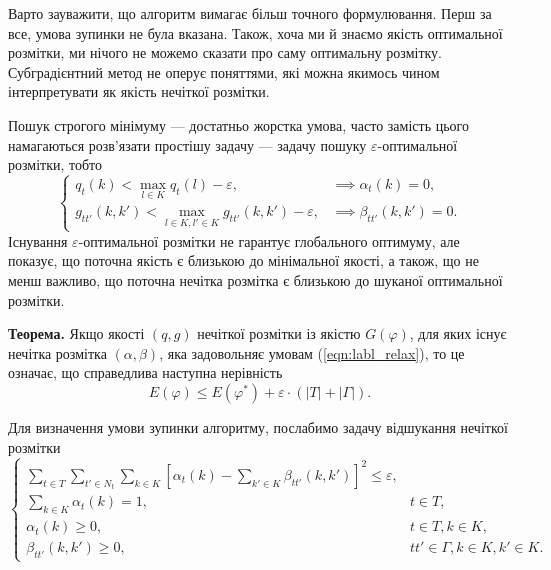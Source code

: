 Варто зауважити, що алгоритм вимагає більш точного формулювання. Перш за все, 
умова зупинки не була вказана. Також, хоча ми й знаємо якість оптимальної розмітки, 
ми нічого не можемо сказати про саму оптимальну розмітку. Субградієнтний метод
не оперує поняттями, які можна якимось чином інтерпретувати як якість нечіткої розмітки.

Пошук строгого мінімуму --- достатньо жорстка умова, часто замість цього намагаються 
розв'язати простішу задачу --- задачу пошуку $\varepsilon$-оптимальної розмітки, тобто
\begin{equation}
    \begin{cases}
    \label{eqn:labl_relax}
      q_t(k) < \max\limits_{l\in K}q_t(l)-\varepsilon , & \implies \alpha_t(k)=0,\\
      g_{tt'}(k,k')< \max\limits_{l\in K, l'\in K}g_{tt'}(k,k')-\varepsilon, & \implies \beta_{tt'}(k,k')=0.
    \end{cases}
  \end{equation}
Існування $\varepsilon$-оптимальної розмітки не гарантує глобального оптимуму, 
але показує, що поточна якість є близькою до мінімальної якості, а також, що не менш важливо,
що поточна нечітка розмітка є близькою до шуканої оптимальної розмітки.

\textbf{Теорема.\cite{lopatka_stop_cond}} Якщо якості $(q,g)$ нечіткої розмітки із якістю $G(\varphi)$, для 
яких існує нечітка розмітка $(\alpha, \beta)$, яка задовольняє умовам (\ref{eqn:labl_relax}), 
то це означає, що справедлива наступна нерівність
\begin{equation}
    E(\varphi)\leq E(\varphi^*) + \varepsilon\cdot (|T|+|\Gamma|).
\end{equation}

Для визначення умови зупинки алгоритму, послабимо задачу відшукання нечіткої розмітки
\begin{equation}
    \begin{cases}
      \sum\limits_{t\in T}\sum\limits_{t'\in N_t}\sum\limits_{k\in K}\left[\alpha_t(k)-\sum\limits_{k' \in K} \beta_{tt'}(k,k')\right]^2\leq \varepsilon,\\
      \sum\limits_{k \in K} \alpha_t(k)=1, & t\in T,\\
      \alpha_t(k)\geq 0, & t\in T, k\in K,\\
      \beta_{tt'}(k,k')\geq 0, & tt'\in \Gamma, k\in K, k'\in K.
    \end{cases}
  \end{equation}

